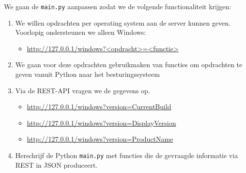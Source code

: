 We gaan de \texttt{main.py} aanpassen zodat we de volgende functionaliteit krijgen:
\begin{enumerate}
\item We willen opdrachten per operating system aan de server kunnen geven. Voorlopig ondersteunen we alleen Windows:
	\begin{itemize}
	\item \url{http://127.0.0.1/windows?<opdracht>=<functie>}
	\end{itemize}
\item We gaan voor deze opdrachten gebruikmaken van functies om opdrachten te geven vanuit Python naar het besturingssysteem
\item Via de REST-API vragen we de gegevens op.
	\begin{itemize}
	\item \url{http://127.0.0.1/windows?version=CurrentBuild}
	\item \url{http://127.0.0.1/windows?version=DisplayVersion}
	\item \url{http://127.0.0.1/windows?version=ProductName}
	\end{itemize}
\item Herschrijf de Python \texttt{main.py} met functies die de gevraagde informatie via REST in JSON produceert.
\end{enumerate}


